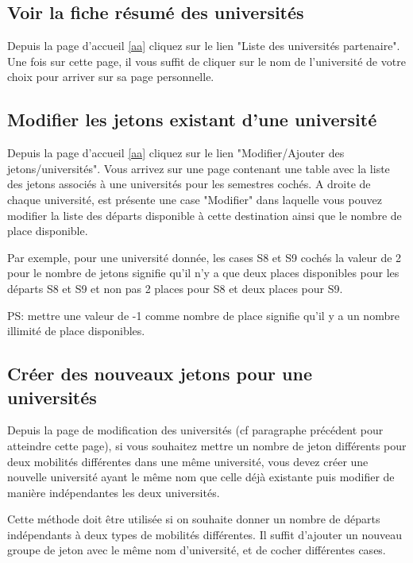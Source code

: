 \subsection{Voir la fiche résumé des universités}

Depuis la page d'accueil \ref{aa} cliquez sur le lien "Liste des universités partenaire". Une fois sur cette page, il vous suffit de cliquer sur le nom de l'université de votre choix pour arriver sur sa page personnelle.
 
\subsection{Modifier les jetons existant d'une université}
\label{mj}
Depuis la page d'accueil \ref{aa} cliquez sur le lien "Modifier/Ajouter des jetons/universités". Vous arrivez sur une page contenant une table avec la liste des jetons associés à une universités pour les semestres cochés. A droite de chaque université, est présente une case "Modifier" dans laquelle vous pouvez modifier la liste des départs disponible à cette destination ainsi que le nombre de place disponible.

\smallbreak

Par exemple, pour une université donnée, les cases S8 et S9 cochés la valeur de 2 pour le nombre de jetons signifie qu'il n'y a que deux places disponibles pour les départs S8 et S9 et non pas 2 places pour S8 et deux places pour S9.

\smallbreak

PS: mettre une valeur de -1 comme nombre de place signifie qu'il y a un nombre illimité de place disponibles.

\subsection{Créer des nouveaux jetons pour une universités}
\label{cj}

Depuis la page de modification des universités (cf paragraphe précédent pour atteindre cette page), si vous souhaitez mettre un nombre de jeton différents pour deux mobilités différentes dans une même université, vous devez créer une nouvelle université ayant le même nom que celle déjà existante puis modifier de manière indépendantes les deux universités.

\smallbreak

Cette méthode doit être utilisée si on souhaite donner un nombre de départs indépendants à deux types de mobilités différentes. Il suffit d'ajouter un nouveau groupe de jeton avec le même nom d'université, et de cocher différentes cases.



